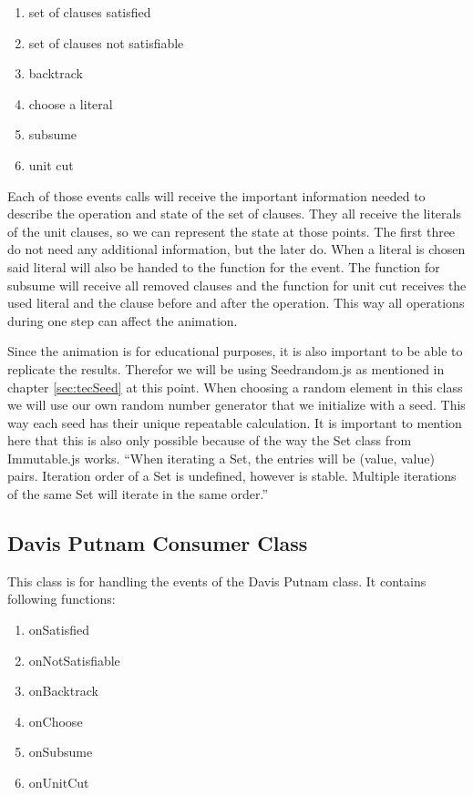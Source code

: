 \begin{enumerate}
    \item set of clauses satisfied
    \item set of clauses not satisfiable
    \item backtrack
    \item choose a literal
    \item subsume
    \item unit cut
\end{enumerate}

Each of those events calls will receive the important information needed to describe the operation and state of the set of clauses. They all receive the literals of the unit clauses, so we can represent the state at those points. The first three do not need any additional information, but the later do. When a literal is chosen said literal will also be handed to the function for the event. The function for subsume will receive all removed clauses and the function for unit cut receives the used literal and the clause before and after the operation. This way all operations during one step can affect the animation.

Since the animation is for educational purposes, it is also important to be able to replicate the results. Therefor we will be using Seedrandom.js as mentioned in chapter \ref{sec:tecSeed} at this point. When choosing a random element in this class we will use our own random number generator that we initialize with a seed. This way each seed has their unique repeatable calculation. It is important to mention here that this is also only possible because of the way the Set class from Immutable.js works. ``When iterating a Set, the entries will be (value, value) pairs. Iteration order of a Set is undefined, however is stable. Multiple iterations of the same Set will iterate in the same order.'' %

\subsection{Davis Putnam Consumer Class}
\label{sub:impDavisPutnamConsumer}
This class is for handling the events of the Davis Putnam class. It contains following functions:

\begin{enumerate}
    \item onSatisfied
    \item onNotSatisfiable
    \item onBacktrack
    \item onChoose
    \item onSubsume
    \item onUnitCut
\end{enumerate}

